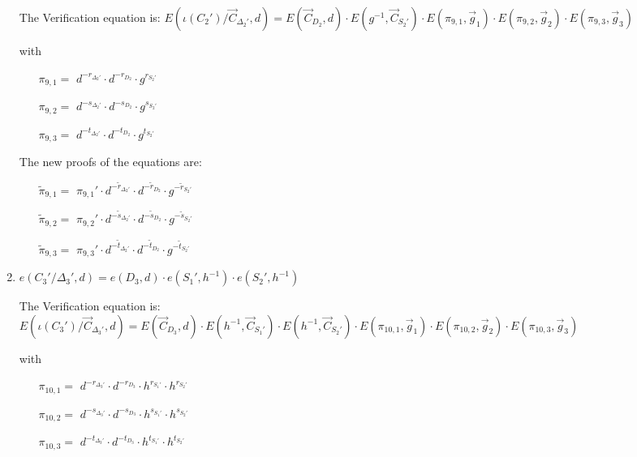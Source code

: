 \begin{description}
\begin{enumerate}
    The Verification equation is: $ E(\iota(C_2')/\vec{C}_{\Delta_2'}, d) = E(\vec{C}_{D_2}, d) \cdot E(g^{-1}, \vec{C}_{S_2'})\cdot E(\pi_{9,1}, \vec{g}_1)\cdot E(\pi_{9,2}, \vec{g}_2)\cdot E(\pi_{9,3}, \vec{g}_3)$

    with
    \begin{itemize}
    \item[$\pi_{9,1} = $] $d^{-r_{\Delta_2'}} \cdot d^{-r_{D_2}} \cdot g^{r_{S_2'}}$
    \item[$\pi_{9,2} = $] $d^{-s_{\Delta_2'}} \cdot d^{-s_{D_2}} \cdot g^{s_{S_2'}}$
    \item[$\pi_{9,3} = $] $d^{-t_{\Delta_2'}} \cdot d^{-t_{D_2}} \cdot g^{t_{S_2'}}$
    \end{itemize}

    The new proofs of the equations are:
    
    \begin{itemize}
    \item[$\tilde{\pi}_{9,1} = $] $\pi_{9,1}' \cdot d^{-\tilde{r}_{\Delta_2'}} \cdot d^{-\tilde{r}_{D_2}} \cdot g^{-\tilde{r}_{S_2'}}$
    \item[$\tilde{\pi}_{9,2} = $] $\pi_{9,2}' \cdot d^{-\tilde{s}_{\Delta_2'}} \cdot d^{-\tilde{s}_{D_2}} \cdot g^{-\tilde{s}_{S_2'}}$
    \item[$\tilde{\pi}_{9,3} = $] $\pi_{9,3}' \cdot d^{-\tilde{t}_{\Delta_2'}} \cdot d^{-\tilde{t}_{D_2}} \cdot g^{-\tilde{t}_{S_2'}}$
    \end{itemize}

  \item $e(C_3'/\boxed{\Delta_3'}, d) = e (\boxed{D_3},d) \cdot e(\boxed{S_1'}, h^{-1}) \cdot e(\boxed{S_2'}, h^{-1})$

    The Verification equation is: $ E(\iota(C_3')/\vec{C}_{\Delta_3'}, d) = E(\vec{C}_{D_3},d) \cdot E(h^{-1}, \vec{C}_{S_1'}) \cdot E(h^{-1}, \vec{C}_{S_2'}) \cdot E(\pi_{10,1}, \vec{g}_1)\cdot E(\pi_{10,2}, \vec{g}_2)\cdot E(\pi_{10,3}, \vec{g}_3)$

    with
    \begin{itemize}
    \item[$\pi_{10,1} = $] $d^{-r_{\Delta_3'}} \cdot d^{-r_{D_3}} \cdot h^{r_{S_1'}} \cdot h^{r_{S_2'}}$
    \item[$\pi_{10,2} = $] $d^{-s_{\Delta_3'}} \cdot d^{-s_{D_3}} \cdot h^{s_{S_1'}} \cdot h^{s_{S_2'}}$
    \item[$\pi_{10,3} = $] $d^{-t_{\Delta_3'}} \cdot d^{-t_{D_3}} \cdot h^{t_{S_1'}} \cdot h^{t_{S_2'}}$
    \end{itemize}


\end{enumerate}
\end{description}
